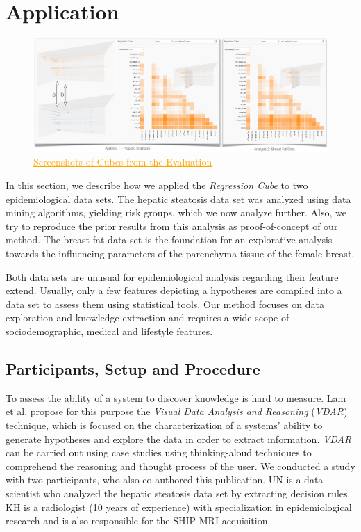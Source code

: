 \documentclass[journal]{style/vgtc} 			          %
\newcommand{\com}[1]{\textcolor{orange}{\uline{#1}}}
\begin{document}
\section{Application} \label{application}
\begin{figure}[htb]
 \centering
 \includegraphics[width=7.0in]{figures/application}
 \caption{
 \com{Screenshots of Cubes from the Evaluation}
 }
  \label{fig:Application}
\end{figure}
In this section, we describe how we applied the \emph{Regression Cube} to two epidemiological data sets.
The hepatic steatosis data set was analyzed using data mining algorithms, yielding risk groups, which we now analyze further.
Also, we try to reproduce the prior results from this analysis as proof-of-concept of our method.
The breast fat data set is the foundation for an explorative analysis towards the influencing parameters of the parenchyma tissue of the female breast.

Both data sets are unusual for epidemiological analysis regarding their feature extend.
Usually, only a few features depicting a hypotheses are compiled into a data set to assess them using statistical tools.
Our method focuses on data exploration and knowledge extraction and requires a wide scope of sociodemographic, medical and lifestyle features.
\subsection{Participants, Setup and Procedure}
To assess the ability of a system to discover knowledge is hard to measure.
Lam et al. \cite{Lam2012} propose for this purpose the \emph{Visual Data Analysis and Reasoning} (\emph{VDAR}) technique, which is focused on the characterization of a systems' ability to generate hypotheses and explore the data in order to extract information.
\emph{VDAR} can be carried out using case studies using thinking-aloud techniques to comprehend the reasoning and thought process of the user.
We conducted a study with two participants, who also co-authored this publication.
UN is a data scientist who analyzed the hepatic steatosis data set by extracting decision rules.
KH is a radiologist (10 years of experience) with specialization in epidemiological research and is also responsible for the SHIP MRI acquisition.
\end{document}
